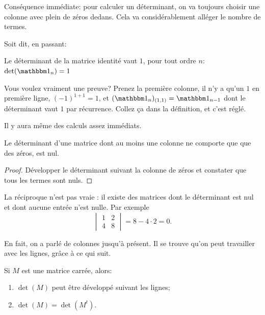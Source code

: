 Conséquence immédiate: pour calculer un déterminant, on va toujours choisir une colonne avec plein de zéros dedans. Cela va considérablement alléger le nombre de termes.

Soit dit, en passant:
\begin{lemma}   \label{LEM_detmtu}
  Le déterminant de la matrice identité vaut \( 1 \), pour tout ordre \( n \):  \( \det(\mtu_n) = 1 \)
\end{lemma}
Vous voulez vraiment une preuve? Prenez la première colonne, il n'y a qu'un \( 1 \) en première ligne, \( (-1)^{1+1} = 1 \), et \( (\mtu_n)_{(1,1)} = \mtu_{n-1} \) dont le déterminant vaut \( 1 \) par récurrence. Collez ça dans la définition, et c'est réglé.

Il y aura même des calculs assez immédiats.
\begin{lemma}    \label{LEM_detMatColonneZeros}
  Le déterminant d'une matrice dont au moins une colonne ne comporte que que des zéros, est nul.
\end{lemma}
\begin{proof}
  Développer le déterminant suivant la colonne de zéros et constater que tous les termes sont nuls.
\end{proof}

La réciproque n'est pas vraie : il existe des matrices dont le déterminant est nul et dont aucune entrée n'est nulle. Par exemple
\begin{equation}
    \begin{vmatrix}
        1    &   2    \\ 
        4    &   8    
    \end{vmatrix} = 8 - 4\cdot 2 = 0.
\end{equation}

En fait, on a parlé de colonnes jusqu'à présent. Il se trouve qu'on peut travailler avec les lignes, grâce à ce qui suit.
\begin{lemma}        \label{LEMooCEQYooYAbctZ}
    Si \( M\) est une matrice carrée, alors:
    \begin{enumerate}
    \item
      \( \det(M) \) peut être développé suivant les lignes;
    \item
      \( \det(M)=\det(M^t)\).
    \end{enumerate}
\end{lemma}

